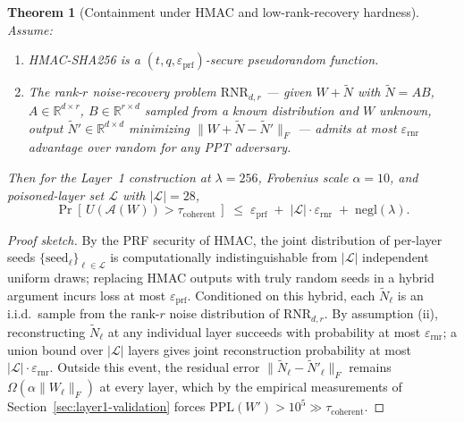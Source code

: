 \documentclass[10pt,letterpaper]{article}
\theoremstyle{definition}
\theoremstyle{plain}
\newtheorem{theorem}{Theorem}
\begin{document}
\begin{theorem}[Containment under HMAC and low-rank-recovery hardness]
\label{thm:containment}
Assume:
\begin{enumerate}[label=(\roman*),leftmargin=2.4em,itemsep=0pt,topsep=2pt]
\item HMAC-SHA256 is a $(t, q, \varepsilon_\text{prf})$-secure
pseudorandom function.
\item The rank-$r$ noise-recovery problem $\mathrm{RNR}_{d,r}$ ---
given $W + \widetilde{N}$ with $\widetilde{N} = AB$,
$A \in \mathbb{R}^{d \times r}$, $B \in \mathbb{R}^{r \times d}$ sampled
from a known distribution and $W$ unknown, output
$\widetilde{N}' \in \mathbb{R}^{d \times d}$ minimizing
$\|W + \widetilde{N} - \widetilde{N}'\|_F$ --- admits at most
$\varepsilon_\text{rnr}$ advantage over random for any PPT adversary.
\end{enumerate}
Then for the Layer~1 construction at $\lambda = 256$, Frobenius scale
$\alpha = 10$, and poisoned-layer set $\mathcal{L}$ with
$|\mathcal{L}| = 28$,
\begin{equation}
\Pr\!\left[\, U\!\left(\mathcal{A}(W)\right) > \tau_\text{coherent} \,\right]
\;\leq\; \varepsilon_\text{prf} \;+\; |\mathcal{L}| \cdot \varepsilon_\text{rnr}
\;+\; \mathrm{negl}(\lambda).
\end{equation}
\end{theorem}

\begin{proof}[Proof sketch]
By the PRF security of HMAC, the joint distribution of per-layer seeds
$\{\text{seed}_\ell\}_{\ell \in \mathcal{L}}$ is computationally
indistinguishable from $|\mathcal{L}|$ independent uniform draws;
replacing HMAC outputs with truly random seeds in a hybrid argument
incurs loss at most $\varepsilon_\text{prf}$. Conditioned on this
hybrid, each $\widetilde{N}_\ell$ is an i.i.d.\ sample from the
rank-$r$ noise distribution of $\mathrm{RNR}_{d,r}$. By assumption
(ii), reconstructing $\widetilde{N}_\ell$ at any individual layer
succeeds with probability at most $\varepsilon_\text{rnr}$; a union
bound over $|\mathcal{L}|$ layers gives joint reconstruction
probability at most $|\mathcal{L}| \cdot \varepsilon_\text{rnr}$.
Outside this event, the residual error
$\|\widetilde{N}_\ell - \widetilde{N}'_\ell\|_F$ remains
$\Omega(\alpha \|W_\ell\|_F)$ at every layer, which by the empirical
measurements of Section~\ref{sec:layer1-validation} forces
$\text{PPL}(W') > 10^5 \gg \tau_\text{coherent}$.
\end{proof}
\end{document}

